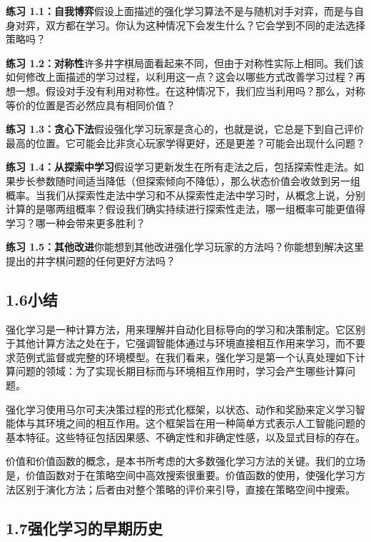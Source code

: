 \documentclass[UTF8, 12pt, fontset=fandol, oneside]{ctexart}
\begin{document}
\noindent\textbf{练习 1.1：自我博弈}\quad 假设上面描述的强化学习算法不是与随机对手对弈，而是与自身对弈，双方都在学习。你认为这种情况下会发生什么？它会学到不同的走法选择策略吗？

\noindent\textbf{练习 1.2：对称性}\quad 许多井字棋局面看起来不同，但由于对称性实际上相同。我们该如何修改上面描述的学习过程，以利用这一点？这会以哪些方式改善学习过程？再想一想。假设对手没有利用对称性。在这种情况下，我们应当利用吗？那么，对称等价的位置是否必然应具有相同价值？

\noindent\textbf{练习 1.3：贪心下法}\quad 假设强化学习玩家是贪心的，也就是说，它总是下到自己评价最高的位置。它可能会比非贪心玩家学得更好，还是更差？可能会出现什么问题？

\noindent\textbf{练习 1.4：从探索中学习}\quad 假设学习更新发生在所有走法之后，包括探索性走法。如果步长参数随时间适当降低（但探索倾向不降低），那么状态价值会收敛到另一组概率。当我们从探索性走法中学习和不从探索性走法中学习时，从概念上说，分别计算的是哪两组概率？假设我们确实持续进行探索性走法，哪一组概率可能更值得学习？哪一种会带来更多胜利？

\noindent\textbf{练习 1.5：其他改进}\quad 你能想到其他改进强化学习玩家的方法吗？你能想到解决这里提出的井字棋问题的任何更好方法吗？

\subsection*{1.6\quad 小结}

强化学习是一种计算方法，用来理解并自动化目标导向的学习和决策制定。它区别于其他计算方法之处在于，它强调智能体通过与环境直接相互作用来学习，而不要求范例式监督或完整的环境模型。在我们看来，强化学习是第一个认真处理如下计算问题的领域：为了实现长期目标而与环境相互作用时，学习会产生哪些计算问题。

强化学习使用马尔可夫决策过程的形式化框架，以状态、动作和奖励来定义学习智能体与其环境之间的相互作用。这个框架旨在用一种简单方式表示人工智能问题的基本特征。这些特征包括因果感、不确定性和非确定性感，以及显式目标的存在。

价值和价值函数的概念，是本书所考虑的大多数强化学习方法的关键。我们的立场是，价值函数对于在策略空间中高效搜索很重要。价值函数的使用，使强化学习方法区别于演化方法；后者由对整个策略的评价来引导，直接在策略空间中搜索。

\subsection*{1.7\quad 强化学习的早期历史}
\end{document}
